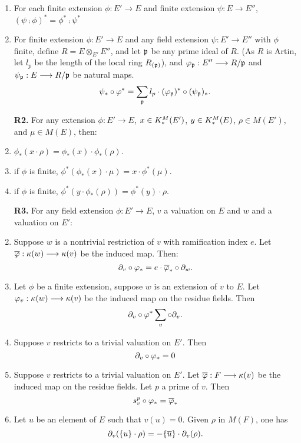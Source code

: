 \begin{defn}
\begin{enumerate}[label=\bfseries R1\alph*., leftmargin=3em]
\item For each finite extension $\phi: E' \to E$ and 
finite extension $\psi: E \to E''$, $(\psi \comp \phi)^* = \phi^* 
\comp \psi^*$

\item For finite extension $\phi: E' \to E$ and any 
field extension $\psi: E' \to E''$ with $\phi$ finite, define $R = E 
\otimes_{E'} E''$, and let $\mathfrak{p}$ be any prime ideal of $R$. (As 
$R$ is Artin, let $l_p$ be the length of the local ring 
$R_{(\mathfrak{p})}$), and $\varphi_{\mathfrak{p}}: E'' \longrightarrow R/{\mathfrak{p}}$ 
and $\psi_{\mathfrak{p}}: E \longrightarrow R/{\mathfrak{p}}$ be natural maps.
\[
\psi_*\circ \varphi^* = \sum_{\mathfrak{p}} l_p \cdot 
(\varphi_{\mathfrak{p}})^* \circ (\psi_{\mathfrak{p}})_*.
\]
\end{enumerate}
\begin{enumerate}[label=\bfseries R2\alph*., leftmargin=3em]
\item[\textbf{R2.}] For any extension $\phi: E' \to E$, $x \in 
K^M_*(E')$, $y \in K^M_*(E)$, $\rho \in M(E')$, and $\mu \in 
M(E)$, then:

\item $\phi_*(x \cdot \rho) = \phi_*(x) \cdot 
\phi_*(\rho)$.

\item if $\phi$ is finite, $\phi^*(\phi_*(x) \cdot 
\mu) = x \cdot \phi^*(\mu)$.

\item if $\phi$ is finite, $\phi^*(y \cdot 
\phi_*(\rho)) = \phi^*(y) \cdot \rho$.
\end{enumerate}
\begin{enumerate}[label=\bfseries R3\alph*., leftmargin=3em]
\item[\textbf{R3.}] For any field extension $\phi: E' \to E$, $v$ 
a valuation on $E$ and $w$ and a valuation on $E'$:

\item Suppose $w$ is a nontrivial restriction of 
$v$ with ramification index $e$. Let $\overline{\varphi}: \kappa(w) \longrightarrow 
\kappa(v)$ be the induced map. Then:
\[
\partial_{v} \circ \varphi_* = e \cdot \overline{\varphi}_* \circ \partial_{w}.
\]

\item Let $\phi$ be a finite extension, suppose
$w$ is an extension of $v$ to $E$. Let $\varphi_v: \kappa(w) \longrightarrow 
\kappa(v)$ be the induced map on the residue fields. Then
\[
\partial_{v} \circ \varphi^* \sum_{v} \circ \partial_{v}.
\]

\item Suppose $v$ restricts to a trivial valuation 
on $E'$. Then
\[
\partial_{v} \circ \varphi_* = 0
\]

\item Suppose $v$ restricts to a trivial valuation 
on $E'$. Let $\overline{\varphi}: F \longrightarrow \kappa(v)$ be the induced map on 
the residue fields. Let $p$ a prime of $v$. Then
\[
s_{v}^{p} \circ \varphi_* = \overline{\varphi}_*
\]

\item Let $u$ be an element of $E$ such that 
$v(u) = 0$. Given $\rho$ in $M(F)$, one has
\[
\partial_{v}(\{u\} \cdot \rho) = -\{\overline{u}\} \cdot \partial_{v}(\rho).
\]
\end{enumerate}
\end{defn}

